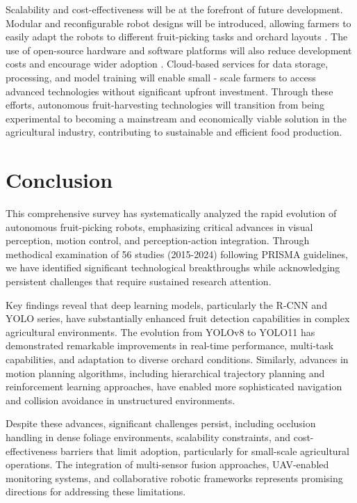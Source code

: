 \documentclass{ieeeaccess}
\begin{document}
Scalability and cost-effectiveness will be at the forefront of future development. Modular and reconfigurable robot designs will be introduced, allowing farmers to easily adapt the robots to different fruit-picking tasks and orchard layouts \cite{lytridis2021overview, li2023multi}. The use of open-source hardware and software platforms will also reduce development costs and encourage wider adoption \cite{zhang2024automatic}. Cloud-based services for data storage, processing, and model training will enable small - scale farmers to access advanced technologies without significant upfront investment. Through these efforts, autonomous fruit-harvesting technologies will transition from being experimental to becoming a mainstream and economically viable solution in the agricultural industry, contributing to sustainable and efficient food production.



\section{Conclusion}
This comprehensive survey has systematically analyzed the rapid evolution of autonomous fruit-picking robots, emphasizing critical advances in visual perception, motion control, and perception-action integration. Through methodical examination of 56 studies (2015-2024) following PRISMA guidelines, we have identified significant technological breakthroughs while acknowledging persistent challenges that require sustained research attention.

Key findings reveal that deep learning models, particularly the R-CNN and YOLO series, have substantially enhanced fruit detection capabilities in complex agricultural environments. The evolution from YOLOv8 to YOLO11 has demonstrated remarkable improvements in real-time performance, multi-task capabilities, and adaptation to diverse orchard conditions. Similarly, advances in motion planning algorithms, including hierarchical trajectory planning and reinforcement learning approaches, have enabled more sophisticated navigation and collision avoidance in unstructured environments.

Despite these advances, significant challenges persist, including occlusion handling in dense foliage environments, scalability constraints, and cost-effectiveness barriers that limit adoption, particularly for small-scale agricultural operations. The integration of multi-sensor fusion approaches, UAV-enabled monitoring systems, and collaborative robotic frameworks represents promising directions for addressing these limitations.
\end{document}
